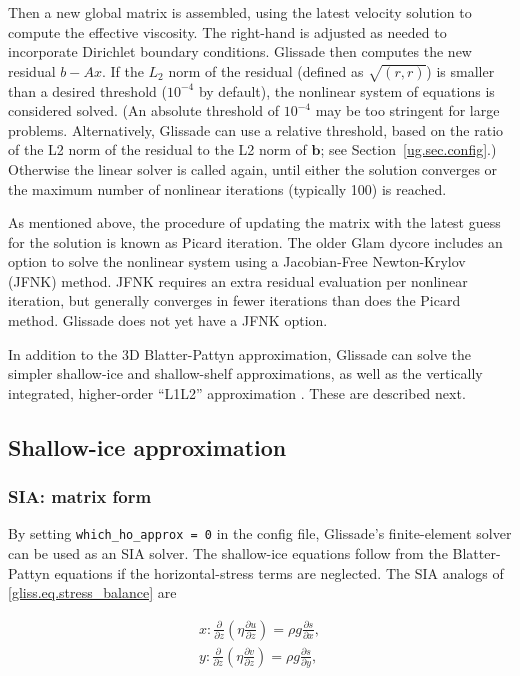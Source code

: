 {Then a new global matrix is assembled, using the latest velocity solution to compute 
the effective viscosity.  The right-hand is adjusted as needed to incorporate Dirichlet
boundary conditions.  Glissade then computes the new residual $b - Ax$.  If the $L_2$ norm of the
residual (defined as $\sqrt{(r,r)}$) is smaller than a desired threshold ($10^{-4}$ by default),
the nonlinear system of equations is considered solved.
(An absolute threshold of $10^{-4}$ may be too stringent for large problems.  Alternatively,
Glissade can use a relative threshold, based on the ratio of the L2 norm of the residual to the L2 norm of
$\mathbf{b}$; see Section~\ref{ug.sec.config}.)
Otherwise the linear solver is called again, until either the solution converges or the 
maximum number of nonlinear iterations (typically 100) is reached.

As mentioned above, the procedure of updating the matrix with the latest guess for the solution
is known as Picard iteration.  The older Glam dycore includes an option
to solve the nonlinear system using a Jacobian-Free Newton-Krylov (JFNK) method.
JFNK requires an extra residual evaluation per nonlinear iteration, but generally
converges in fewer iterations than does the Picard method.  Glissade does not yet
have a JFNK option.

In addition to the 3D Blatter-Pattyn approximation, Glissade can solve the simpler shallow-ice
and shallow-shelf approximations, as well as the vertically integrated, higher-order ``L1L2''
approximation \citep{Schoof:2010dl}.  These are described next.

\subsection{Shallow-ice approximation}
\label{sc:glissade-sia}

\subsubsection{SIA: matrix form}

By setting \texttt{which\_ho\_approx = 0} in the config file, Glissade's finite-element solver can be used as an
SIA solver. The shallow-ice equations follow from the Blatter-Pattyn equations if the horizontal-stress
terms are neglected.  The SIA analogs of \eqref{gliss.eq.stress_balance} are

\begin{equation}
  \label{gliss.eq.stress_balance_sia}
  \begin{split}
    x: \frac{\partial }{\partial z}\left( \eta \frac{\partial u}{\partial z} \right) = \rho g\frac{\partial s}{\partial x}, \\
    y: \frac{\partial }{\partial z}\left( \eta \frac{\partial v}{\partial z} \right) = \rho g\frac{\partial s}{\partial y}, \\
  \end{split}
\end{equation}

}
